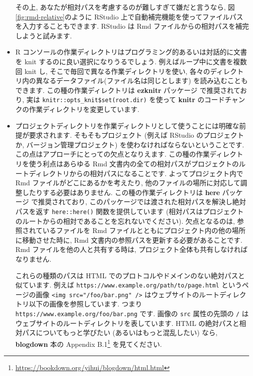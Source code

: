 \documentclass[
  11pt,
  lualatex,
  ja=standard]{bxjsreport}
\renewcommand{\href}[2]{#2\footnote{\url{#1}}}
\begin{document}
\begin{itemize}
  その上, あなたが相対パスを考慮するのが難しすぎて嫌だと言うなら, 図\ref{fig:rmd-relative}のように RStudio 上で自動補完機能を使ってファイルパスを入力することもできます. RStudio は Rmd ファイルからの相対パスを補完しようと試みます.
\item
  R コンソールの作業ディレクトリはプログラミング的あるいは対話的に文書を knit するのに良い選択になりうるでしょう. 例えばループ中に文書を複数回 knit し, そこで毎回で異なる作業ディレクトリを使い, 各々のディレクトリ内の異なるデータファイル(ファイル名は同じとします) を読み込むこともできます. この種の作業ディレクトリは \textbf{ezknitr} パッケージ \autocite{R-ezknitr} で推奨されており, 実は \texttt{knitr::opts\_knit\$set(root.dir)} を使って \textbf{knitr} のコードチャンクの作業ディレクトリを変更しています.
\item
  プロジェクトディレクトリを作業ディレクトリとして使うことには明確な前提が要求されます. そもそもプロジェクト (例えば RStudio のプロジェクトか, バージョン管理プロジェクト) を使わなければならないということです. この点はアプローチにとっての欠点となりえます. この種の作業ディレクトリを使う利点はあらゆる Rmd 文書内の全ての相対パスがプロジェクトのルートディレクトリからの相対パスになることです. よってプロジェクト内で Rmd ファイルがどこにあるかを考えたり, 他のファイルの場所に対応して調整したりする必要はありません. この種の作業ディレクトリは \textbf{here} パッケージ \autocite{R-here} で推奨されており, このパッケージでは渡された相対パスを解決し絶対パスを返す \texttt{here::here()} 関数を提供しています (相対パスはプロジェクトのルートからの相対であることを忘れないでください). 欠点となるのは, 参照されているファイルを Rmd ファイルとともにプロジェクト内の他の場所に移動させた時に, Rmd 文書内の参照パスを更新する必要があることです. Rmd ファイルを他の人と共有する時は, プロジェクト全体も共有しなければなりません.

  これらの種類のパスは HTML でのプロトコルやドメインのない絶対パスと似ています. 例えば \texttt{https://www.example.org/path/to/page.html} というページの画像 \texttt{\textless{}img\ src="/foo/bar.png"\ /\textgreater{}} はウェブサイトのルートディレクトリ以下の画像を参照しています. つまり \texttt{https://www.example.org/foo/bar.png} です. 画像の \texttt{src} 属性の先頭の \texttt{/} はウェブサイトのルートディレクトリを表しています. HTML の絶対パスと相対パスについてもっと学びたい (あるいはもっと混乱したい) なら, \href{https://bookdown.org/yihui/blogdown/html.html}{\textbf{blogdown} 本の Appendix B.1} \autocite{blogdown2017} を見てください.
\end{itemize}
\end{document}
